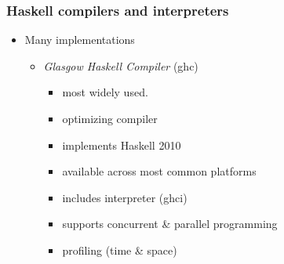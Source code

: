 \begin{frame}
  \frametitle{Haskell compilers and interpreters}
  \begin{itemize}
    \item Many implementations
      \begin{itemize}
        \item \emph{Glasgow Haskell Compiler} (ghc)
          \begin{itemize}
            \item most widely used.
            \item optimizing compiler
            \item implements Haskell 2010
            \item available across most common platforms
            \item includes interpreter (ghci)
            \item supports concurrent \& parallel programming
            \item profiling (time \& space)
          \end{itemize}
      \end{itemize}    
  \end{itemize}
\end{frame}